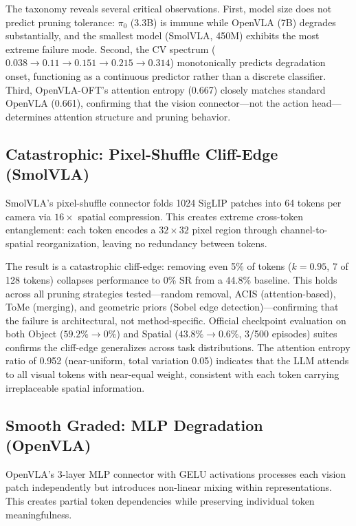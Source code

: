 \documentclass[letterpaper]{article}
\begin{document}
The taxonomy reveals several critical observations. First, model size does not predict pruning tolerance: $\pi_0$ (3.3B) is immune while OpenVLA (7B) degrades substantially, and the smallest model (SmolVLA, 450M) exhibits the most extreme failure mode. Second, the CV spectrum ($0.038 \to 0.11 \to 0.151 \to 0.215 \to 0.314$) monotonically predicts degradation onset, functioning as a continuous predictor rather than a discrete classifier. Third, OpenVLA-OFT's attention entropy (0.667) closely matches standard OpenVLA (0.661), confirming that the vision connector---not the action head---determines attention structure and pruning behavior.

\subsection{Catastrophic: Pixel-Shuffle Cliff-Edge (SmolVLA)}

SmolVLA's pixel-shuffle connector folds 1024 SigLIP patches into 64 tokens per camera via $16\times$ spatial compression. This creates extreme cross-token entanglement: each token encodes a $32\times32$ pixel region through channel-to-spatial reorganization, leaving no redundancy between tokens.

The result is a catastrophic cliff-edge: removing even 5\% of tokens ($k=0.95$, 7 of 128 tokens) collapses performance to 0\% SR from a 44.8\% baseline. This holds across all pruning strategies tested---random removal, ACIS (attention-based), ToMe (merging), and geometric priors (Sobel edge detection)---confirming that the failure is architectural, not method-specific. Official checkpoint evaluation on both Object ($59.2\% \to 0\%$) and Spatial ($43.8\% \to 0.6\%$, 3/500 episodes) suites confirms the cliff-edge generalizes across task distributions. The attention entropy ratio of 0.952 (near-uniform, total variation 0.05) indicates that the LLM attends to all visual tokens with near-equal weight, consistent with each token carrying irreplaceable spatial information.

\subsection{Smooth Graded: MLP Degradation (OpenVLA)}

OpenVLA's 3-layer MLP connector with GELU activations processes each vision patch independently but introduces non-linear mixing within representations. This creates partial token dependencies while preserving individual token meaningfulness.
\end{document}
